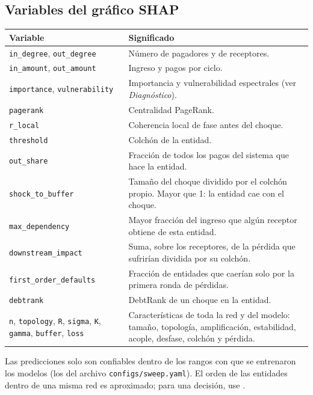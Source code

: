 \subsection*{Variables del gráfico SHAP}
\begin{center}
\small
\begin{longtable}{p{}p{}}
\toprule
\textbf{Variable} & \textbf{Significado} \\
\midrule
\endhead
\texttt{in\_degree}, \texttt{out\_degree} & Número de pagadores y de receptores. \\
\texttt{in\_amount}, \texttt{out\_amount} & Ingreso y pagos por ciclo. \\
\texttt{importance}, \texttt{vulnerability} & Importancia y vulnerabilidad espectrales
(ver \emph{Diagnóstico}). \\
\texttt{pagerank} & Centralidad PageRank. \\
\texttt{r\_local} & Coherencia local de fase antes del choque. \\
\texttt{threshold} & Colchón de la entidad. \\
\texttt{out\_share} & Fracción de todos los pagos del sistema que hace la entidad. \\
\texttt{shock\_to\_buffer} & Tamaño del choque dividido por el colchón propio. Mayor que 1:
la entidad cae con el choque. \\
\texttt{max\_dependency} & Mayor fracción del ingreso que algún receptor obtiene de esta
entidad. \\
\texttt{downstream\_impact} & Suma, sobre los receptores, de la pérdida que sufrirían
dividida por su colchón. \\
\texttt{first\_order\_defaults} & Fracción de entidades que caerían solo por la primera
ronda de pérdidas. \\
\texttt{debtrank} & DebtRank de un choque en la entidad. \\
\texttt{n}, \texttt{topology}, \texttt{R}, \texttt{sigma}, \texttt{K}, \texttt{gamma},
\texttt{buffer}, \texttt{loss} & Características de toda la red y del modelo: tamaño,
topología, amplificación, estabilidad, acople, desfase, colchón y pérdida. \\
\bottomrule
\end{longtable}
\end{center}

\begin{aviso}
Las predicciones solo son confiables dentro de los rangos con que se entrenaron los
modelos (los del archivo \texttt{configs/sweep.yaml}). El orden de las entidades dentro de
una misma red es aproximado; para una decisión, use .
\end{aviso}

